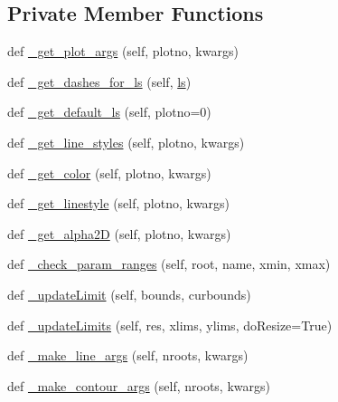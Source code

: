 \subsection*{Private Member Functions}
\begin{DoxyCompactItemize}
\item 
def \mbox{\hyperlink{classgetdist_1_1plots_1_1GetDistPlotter_a3611eb8b23f9f095922b216ead8d83ce}{\+\_\+get\+\_\+plot\+\_\+args}} (self, plotno, kwargs)
\item 
def \mbox{\hyperlink{classgetdist_1_1plots_1_1GetDistPlotter_abde32f397bb48f38fb3a99ec754c6487}{\+\_\+get\+\_\+dashes\+\_\+for\+\_\+ls}} (self, \mbox{\hyperlink{plotTT_8m_aac1113e50f7f1460beeaeeba69f63701}{ls}})
\item 
def \mbox{\hyperlink{classgetdist_1_1plots_1_1GetDistPlotter_a3077b1755957ea13d90faa18e84af3d0}{\+\_\+get\+\_\+default\+\_\+ls}} (self, plotno=0)
\item 
def \mbox{\hyperlink{classgetdist_1_1plots_1_1GetDistPlotter_a919928e323c1253b5e2687ad41b331df}{\+\_\+get\+\_\+line\+\_\+styles}} (self, plotno, kwargs)
\item 
def \mbox{\hyperlink{classgetdist_1_1plots_1_1GetDistPlotter_afe806ee81dad4b9d7c3f2c5e55846b95}{\+\_\+get\+\_\+color}} (self, plotno, kwargs)
\item 
def \mbox{\hyperlink{classgetdist_1_1plots_1_1GetDistPlotter_ac59e8aaef9e884dfd9fe405a57673dbe}{\+\_\+get\+\_\+linestyle}} (self, plotno, kwargs)
\item 
def \mbox{\hyperlink{classgetdist_1_1plots_1_1GetDistPlotter_a5814b23cb1d375a904161d0a7b2b78b9}{\+\_\+get\+\_\+alpha2D}} (self, plotno, kwargs)
\item 
def \mbox{\hyperlink{classgetdist_1_1plots_1_1GetDistPlotter_a578f829c6d10c20eb150703b876f0411}{\+\_\+check\+\_\+param\+\_\+ranges}} (self, root, name, xmin, xmax)
\item 
def \mbox{\hyperlink{classgetdist_1_1plots_1_1GetDistPlotter_adc50adc1d2b8ceff5c95ea31a9e886a1}{\+\_\+update\+Limit}} (self, bounds, curbounds)
\item 
def \mbox{\hyperlink{classgetdist_1_1plots_1_1GetDistPlotter_aa39ae5fcf55546a48cc27bc838ca04ff}{\+\_\+update\+Limits}} (self, res, xlims, ylims, do\+Resize=True)
\item 
def \mbox{\hyperlink{classgetdist_1_1plots_1_1GetDistPlotter_a7a9e50f1885013fa6dbe70242e1f8fa3}{\+\_\+make\+\_\+line\+\_\+args}} (self, nroots, kwargs)
\item 
def \mbox{\hyperlink{classgetdist_1_1plots_1_1GetDistPlotter_af3c4b93770391c350949913b5f3eeaa8}{\+\_\+make\+\_\+contour\+\_\+args}} (self, nroots, kwargs)

\end{DoxyCompactItemize}
